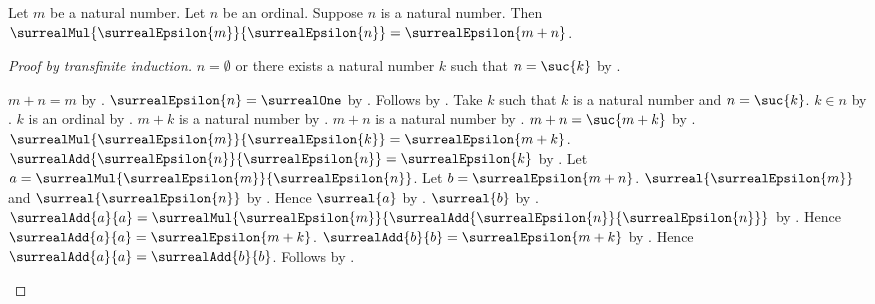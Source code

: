 \begin{theorem}\label{surreal_epsilon_product}
    Let $m$ be a natural number.
    Let $n$ be an ordinal.
    Suppose $n$ is a natural number.
    Then $\surrealMul{\surrealEpsilon{m}}{\surrealEpsilon{n}}
        =\surrealEpsilon{m+n}$.
\end{theorem}
\begin{proof}[Proof by transfinite induction]
    $n=\emptyset$ or there exists a natural number $k$ such that
        $n=\suc{k}$ by .
    \begin{byCase}
            $m+n=m$ by .
            $\surrealEpsilon{n}=\surrealOne$
                by .
            Follows by
                .
            Take $k$ such that $k$ is a natural number and
                $n=\suc{k}$.
            $k\in n$ by .
            $k$ is an ordinal by .
            $m+k$ is a natural number by .
            $m+n$ is a natural number by .
            $m+n=\suc{m+k}$
                by .
            $\surrealMul{\surrealEpsilon{m}}{\surrealEpsilon{k}}
                =\surrealEpsilon{m+k}$.
            $\surrealAdd{\surrealEpsilon{n}}{\surrealEpsilon{n}}
                =\surrealEpsilon{k}$
                by .
            Let $a=\surrealMul{\surrealEpsilon{m}}
                {\surrealEpsilon{n}}$.
            Let $b=\surrealEpsilon{m+n}$.
            $\surreal{\surrealEpsilon{m}}$ and
                $\surreal{\surrealEpsilon{n}}$
                by .
            Hence $\surreal{a}$ by .
            $\surreal{b}$ by .
            $\surrealAdd{a}{a}
                =\surrealMul{\surrealEpsilon{m}}
                    {\surrealAdd{\surrealEpsilon{n}}{\surrealEpsilon{n}}}$
                by .
            Hence $\surrealAdd{a}{a}=\surrealEpsilon{m+k}$.
            $\surrealAdd{b}{b}=\surrealEpsilon{m+k}$
                by .
            Hence $\surrealAdd{a}{a}=\surrealAdd{b}{b}$.
            Follows by .
    \end{byCase}
\end{proof}

